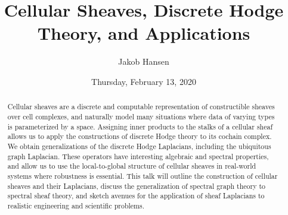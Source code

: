 \documentclass{UAmathtalk}
\author{Jakob Hansen}
\title{Cellular Sheaves, Discrete Hodge Theory, and Applications}
\date{Thursday, February 13, 2020}
\begin{document}
\maketitle

\begin{abstract}
Cellular sheaves are a discrete and computable representation of constructible sheaves over cell complexes, and naturally model many situations where data of varying types is parameterized by a space. Assigning inner products to the stalks of a cellular sheaf allows us to apply the constructions of discrete Hodge theory to its cochain complex. We obtain generalizations of the discrete Hodge Laplacians, including the ubiquitous graph Laplacian. These operators have interesting algebraic and spectral properties, and allow us to use the local-to-global structure of cellular sheaves in real-world systems where robustness is essential. This talk will outline the construction of cellular sheaves and their Laplacians, discuss the generalization of spectral graph theory to spectral sheaf theory, and sketch avenues for the application of sheaf Laplacians to realistic engineering and scientific problems.
\end{abstract}
\end{document}
